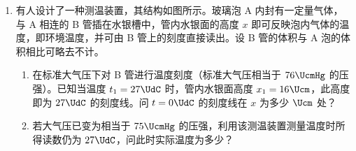 \documentclass[\gkver]{gaokaozhenti}
\begin{document}
\begin{enumerate}
{$I_{1} = \frac{E}{R_{1} + R_{2} + R}$ ③

$S_{1}$、$S_{2}$ 均闭合时流过灯泡的电流

$I_{2} = \frac{E}{\frac{R R_{1}}{R + R_{1}} + R_{3}} \cdot \frac{R_{1}}{R + R_{1}}$ ④

同样正常发光，应有

$I_{1} = I_{2}$ ⑤

即

$\frac{E}{R_{1} + R_{2} + R} = \frac{E}{\frac{R R_{1}}{R + R_{1}} + R_{3}} \cdot \frac{R_{1}}{R + R_{1}}$ ⑥

解之，得

$R = \frac{R_{1}(R_{1} + R_{2} - R_{3})}{R_{3}} = \frac{3(3 + 9 - 6)}{6}\UO = 3\UO$

$U = \frac{E}{R_{1} + R_{2} + R}\cdot R = \frac{24}{3 + 9 + 3}\times 3\UV = 4.8\UV$

\textbf{评分标准}：（1）3 分：其中① 1 分② 2 分

（2）9 分：列出③式 1 分，列出④式 2 分。列出⑤式 2 分（直接列出⑥式得 5 分），得出 $R$、$U$ 结果各 2 分。
}

\item
有人设计了一种测温装置，其结构如图所示。玻璃泡 A 内封有一定量气体，与 A 相连的 B 管插在水银槽中，管内水银面的高度 $x$ 即可反映泡内气体的温度，即环境温度，并可由 B 管上的刻度直接读出。设 B 管的体积与 A 泡的体积相比可略去不计。
\begin{enumerate}
	\item
	在标准大气压下对 B 管进行温度刻度（标准大气压相当于 $76\UcmHg$ 的压强）。已知当温度 $t_{1} = 27\UdC$ 时，管内水银面高度 $x_{1} = 16\Ucm$，此高度即为 $27\UdC$ 的刻度线。问 $t = 0\UdC$ 的刻度线在 $x$ 为多少 $\Ucm$ 处？
	\item
	若大气压已变为相当于 $75\UcmHg$ 的压强，利用该测温装置测量温度时所得读数仍为 $27\UdC$，问此时实际温度为多少？
\end{enumerate}
\onepicture[align=right, h=6cm]{}

\end{enumerate}
\end{document}
